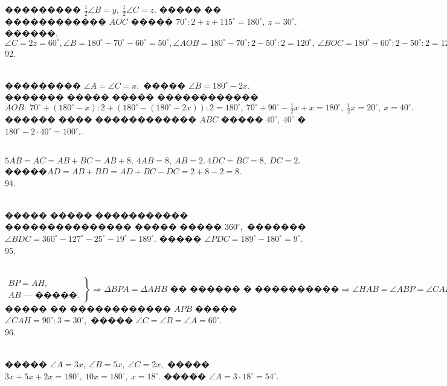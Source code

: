 \documentclass[12pt]{article}
\begin{document}
��������� $\frac{1}{2}\angle B=y,\ \frac{1}{2}\angle C=z.$ ����� �� ������������ $AOC$ ����� $70^\circ:2+z+115^\circ=180^\circ,\ z=30^\circ.$ ������, $\angle C=2z=60^\circ, \angle B=180^\circ-70^\circ-60^\circ=50^\circ, \angle AOB=180^\circ-70^\circ:2-50^\circ:2=120^\circ,\ \angle BOC=180^\circ-60^\circ:2-50^\circ:2=125^\circ.$\\
92. \begin{figure}[ht!]
\end{figure}\\
��������� $\angle A=\angle C=x,$ ����� $\angle B=180^\circ-2x.$ ������� ����� ����� ������������ $AOB:\ 70^\circ+(180^\circ-x):2+(180^\circ-(180^\circ-2x)):2=180^\circ,\ 70^\circ +90^\circ-\frac{1}{2}x+x=180^\circ,\ \frac{1}{2}x=20^\circ,\ x=40^\circ.$ ������ ���� ������������ $ABC$ ����� $40^\circ,\ 40^\circ$ � $180^\circ-2\cdot40^\circ=100^\circ.$\newpage{}. \begin{figure}[ht!]
\end{figure}\\
$5AB=AC=AB+BC=AB+8,\ 4AB=8,\ AB=2.\ 4DC=BC=8,\ DC=2.$ �����$AD=AB+BD=AD+BC-DC=2+8-2=8.$\\
94. \begin{figure}[ht!]
\end{figure}\\
����� ����� ����������� ��������������� ����� ����� $360^\circ,$ ������� $\angle BDC=360^\circ-127^\circ-25^\circ-19^\circ=189^\circ.$ ����� $\angle PDC=189^\circ-180^\circ=9^\circ.$\\
95. \begin{figure}[ht!]
\end{figure}\\
$\left.\begin{array}{l}BP=AH,\\
AB\text{ --- �����.} \end{array}\right\}\Rightarrow \Delta BPA=\Delta AHB\text{ �� ������ � ����������}\Rightarrow \angle HAB=\angle ABP=\angle CAH.$ ����� �� ������������ $APB$ ����� $\angle CAH=90^\circ:3=30^\circ,$ ����� $\angle C=\angle B=\angle A=60^\circ.$\\
96. \begin{figure}[ht!]
\end{figure}\\
����� $\angle A=3x,\ \angle B=5x,\ \angle C=2x,$ ����� $3x+5x+2x=180^\circ,\ 10x=180^\circ,\ x=18^\circ.$ ����� $\angle A=3\cdot18^\circ=54^\circ.$
\end{document}
